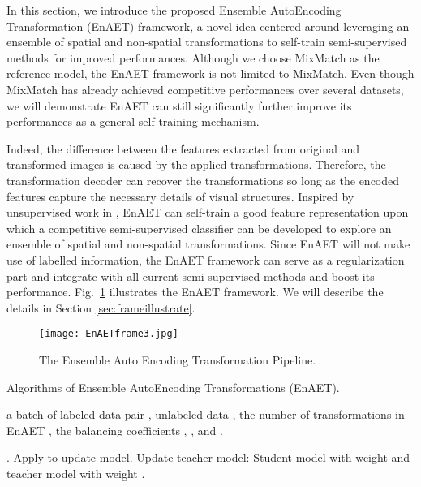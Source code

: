 \documentclass[journal]{IEEEtran}
\begin{document}
\par In this section, we introduce the proposed Ensemble AutoEncoding Transformation (EnAET) framework, a novel idea centered around leveraging an ensemble of spatial and non-spatial transformations to self-train  semi-supervised methods for improved performances. Although we choose MixMatch \cite{berthelot2019mixmatch} as the reference model, the EnAET framework is not limited to MixMatch.  Even though MixMatch has already achieved competitive performances over several datasets, we will demonstrate EnAET can still significantly further improve its performances as a general self-training mechanism.




\par Indeed, the difference between the features extracted from original and transformed images is caused by the applied transformations. Therefore, the transformation decoder can recover the transformations so long as the encoded features capture the necessary details of visual structures. Inspired by unsupervised work in \cite{zhang2019aet}, EnAET can self-train a good feature representation upon which a competitive semi-supervised classifier can be developed to explore an ensemble of spatial and non-spatial transformations. Since EnAET will not make use of labelled information, the EnAET framework can serve as a regularization part and integrate with all current semi-supervised methods and boost its performance. Fig.~\ref{fig:figAET} illustrates the EnAET framework. We will describe the details in Section \ref{sec:frameillustrate}.
\begin{figure}[t]

\centering
\texttt{[image: EnAETframe3.jpg]}
\caption{The Ensemble Auto Encoding Transformation Pipeline.}
\label{fig:figAET}
\end{figure}
\begin{algorithm*}[!htb]
\caption{Algorithms of Ensemble AutoEncoding Transformations (EnAET).}
\label{alg:A}
\begin{algorithmic}[1]
\Require a batch of labeled data pair , unlabeled data , the number of transformations in EnAET , the balancing coefficients , , and .

\State  {}
\State  {}
\State  {}.
\State  {}
\EndFor
\State  {}
\State Apply  to update model.
\State Update teacher model: 
\Ensure Student model with weight  and teacher model with weight .
\end{algorithmic}
\end{algorithm*}
\end{document}

